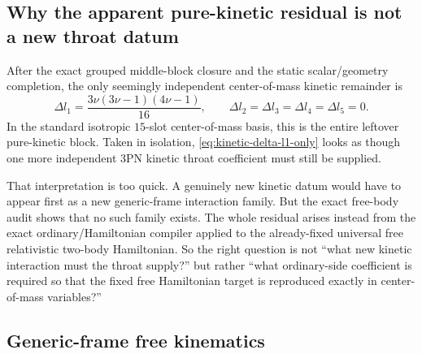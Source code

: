\documentclass[11pt]{article}
\begin{document}
\subsection{Why the apparent pure-kinetic residual is not a new throat datum}
\label{sec:kinetic-why}

After the exact grouped middle-block closure and the static scalar/geometry
completion, the only seemingly independent center-of-mass kinetic remainder is
\begin{equation}
\boxed{
\Delta l_1=
\frac{3\nu(3\nu-1)(4\nu-1)}{16},
\qquad
\Delta l_2=\Delta l_3=\Delta l_4=\Delta l_5=0.
}
\label{eq:kinetic-delta-l1-only}
\end{equation}
In the standard isotropic $15$-slot center-of-mass basis, this is the entire
leftover pure-kinetic block.  Taken in isolation, \eqref{eq:kinetic-delta-l1-only}
looks as though one more independent $3$PN kinetic throat coefficient must still
be supplied.

That interpretation is too quick.  A genuinely new kinetic datum would have to
appear first as a new generic-frame interaction family.  But the exact free-body
audit shows that no such family exists.  The whole residual arises instead from
the exact ordinary/Hamiltonian compiler applied to the already-fixed universal
free relativistic two-body Hamiltonian.  So the right question is not ``what new
kinetic interaction must the throat supply?'' but rather ``what ordinary-side
coefficient is required so that the fixed free Hamiltonian target is reproduced
exactly in center-of-mass variables?''

\subsection{Generic-frame free kinematics}
\label{sec:kinetic-generic}
\end{document}

